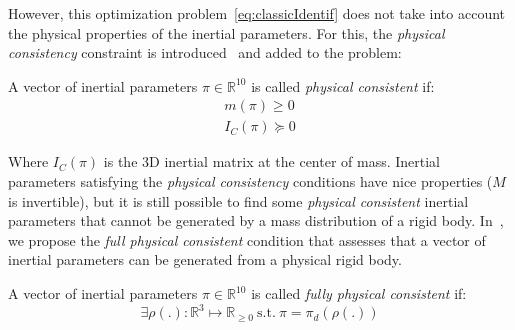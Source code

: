 However, this optimization problem~\ref{eq:classicIdentif} does not take into account the physical properties of the inertial parameters.
For this, the \emph{physical consistency} constraint is introduced~\cite{yoshida1994} and added to the problem:
\begin{definition}
  A vector of inertial parameters $\pi\in\mathbb{R}^{10}$ is called \emph{physical consistent} if:
\begin{equation}
  \begin{aligned}
    m(\pi) \geq 0\\
    I_C(\pi) \succeq 0
  \end{aligned}
\end{equation}
\end{definition}
Where $I_C(\pi)$ is the 3D inertial matrix at the center of mass.
Inertial parameters satisfying the \emph{physical consistency} conditions have nice properties ($M$ is invertible), but it is still possible to find some \emph{physical consistent} inertial parameters that cannot be generated by a mass distribution of a rigid body.
In~\cite{traversaro:iros:2016}, we propose the \emph{full physical consistent} condition that assesses that a vector of inertial parameters can be generated from a physical rigid body.

\begin{definition}
  A vector of inertial parameters $\pi\in\mathbb{R}^{10}$ is called \emph{fully physical consistent} if:
  \begin{equation}
    \exists\rho(.):\mathbb{R}^3\mapsto\mathbb{R}_{\geq 0}\ \text{s.t.}\ \pi = \pi_d(\rho(.))
  \end{equation}
\end{definition}

